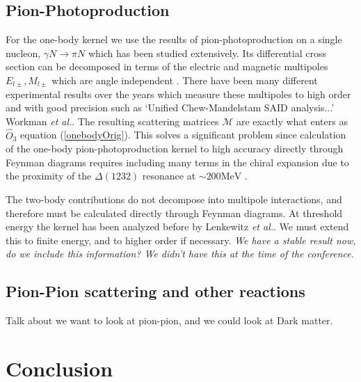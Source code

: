 \documentclass[a4paper,11pt]{article}
\newcommand{\etal}{\textit{et al.}}
\newcommand{\ques}[1]{\color{red}\textit{ #1 }\color{black}}
\newcommand{\MeV}{\mathrm{MeV}}
\begin{document}
\subsection{Pion-Photoproduction}
For the one-body kernel we use the results of pion-photoproduction on a single nucleon, $\gamma N \to \pi N$ which has
been studied extensively.
Its differential cross section can be decomposed in terms of the
electric and magnetic multipoles $E_{l\pm}, M_{l\pm}$ which are angle
independent  \cite{pionphoto}.
There have been many different experimental results over the years
which measure these multipoles to high order and with good precision
such as `Unified Chew-Mandelstam SAID analysis...' Workman \etal \cite{multipolePionPion}.
The resulting scattering matrices $\mathcal{M}$ are exactly what enters as $\hat{O}_3$ equation (\ref{onebodyOrig}). 
This solves a significant problem since calculation of the one-body pion-photoproduction kernel to high accuracy directly through Feynman diagrams requires including many terms in the chiral expansion due to the proximity of the $\Delta(1232)$ resonance at $\sim 200\MeV$ \cite{chiralpionphoto}.

The two-body contributions do not decompose into multipole interactions, and therefore must be calculated directly through Feynman diagrams. At threshold energy the kernel has been analyzed before by Lenkewitz \etal \cite{L2011, L2013}. We must extend this to finite energy, and to higher order if necessary.
\ques{We have a stable result now, do we include this information? We didn't have this at the time of the conference.}
\subsection{Pion-Pion scattering and other reactions}
Talk about we want to look at pion-pion, and we could look at Dark matter.
\section{Conclusion}
\end{document}
